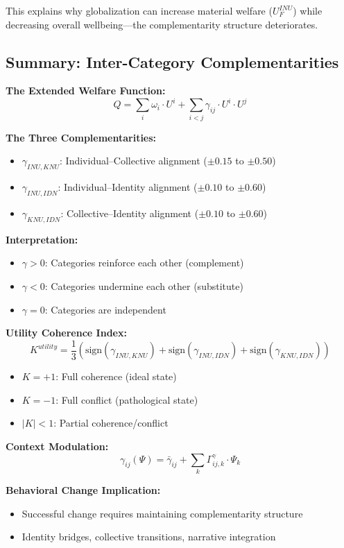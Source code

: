 This explains why globalization can increase material welfare ($U^{INU}_F$) 
while decreasing overall wellbeing---the complementarity structure deteriorates.

\subsection{Summary: Inter-Category Complementarities}

\begin{tcolorbox}[colback=gray!5!white, colframe=gray!75!black, title=Section C.9 Summary]
\textbf{The Extended Welfare Function:}
$$Q = \sum_{i} \omega_i \cdot U^i + \sum_{i < j} \gamma_{ij} \cdot U^i \cdot U^j$$

\textbf{The Three Complementarities:}
\begin{itemize}
\item $\gamma_{INU,KNU}$: Individual--Collective alignment ($\pm 0.15$ to $\pm 0.50$)
\item $\gamma_{INU,IDN}$: Individual--Identity alignment ($\pm 0.10$ to $\pm 0.60$)
\item $\gamma_{KNU,IDN}$: Collective--Identity alignment ($\pm 0.10$ to $\pm 0.60$)
\end{itemize}

\textbf{Interpretation:}
\begin{itemize}
\item $\gamma > 0$: Categories reinforce each other (complement)
\item $\gamma < 0$: Categories undermine each other (substitute)
\item $\gamma = 0$: Categories are independent
\end{itemize}

\textbf{Utility Coherence Index:}
$$K^{utility} = \frac{1}{3} \left( \text{sign}(\gamma_{INU,KNU}) + \text{sign}(\gamma_{INU,IDN}) + \text{sign}(\gamma_{KNU,IDN}) \right)$$
\begin{itemize}
\item $K = +1$: Full coherence (ideal state)
\item $K = -1$: Full conflict (pathological state)
\item $|K| < 1$: Partial coherence/conflict
\end{itemize}

\textbf{Context Modulation:}
$$\gamma_{ij}(\Psi) = \bar{\gamma}_{ij} + \sum_k \Gamma^{\gamma}_{ij,k} \cdot \Psi_k$$

\textbf{Behavioral Change Implication:}
\begin{itemize}
\item Successful change requires maintaining complementarity structure
\item Identity bridges, collective transitions, narrative integration
\end{itemize}
\end{tcolorbox}


